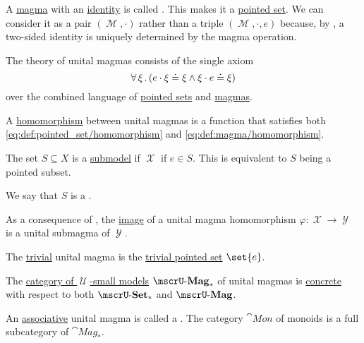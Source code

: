 \begin{definition}\label{def:unital_magma}
  A \hyperref[def:magma]{magma} with an \hyperref[def:magma_identity]{identity} is called . This makes it a \hyperref[def:pointed_set]{pointed set}. We can consider it as a pair \( (\mscrM, \cdot) \) rather than a triple \( (\mscrM, \cdot, e) \) because, by , a two-sided identity is uniquely determined by the magma operation.

  \begin{thmenum}
     The theory of unital magmas consists of the single axiom
    \begin{equation}\label{eq:def:unital_magma/theory/identity}
      \forall \thinspace \xi \thinspace . \thinspace (e \cdot \xi \doteq \xi \wedge \xi \cdot e \doteq \xi)
    \end{equation}
    over the combined language of \hyperref[def:pointed_set/theory]{pointed sets} and \hyperref[def:magma/theory]{magmas}.

     A \hyperref[def:first_order_homomorphism]{homomorphism} between unital magmas is a function that satisfies both \eqref{eq:def:pointed_set/homomorphism} and \eqref{eq:def:magma/homomorphism}.

     The set \( S \subseteq X \) is a \hyperref[thm:substructure_is_model]{submodel} if \( \mscrX \) if \( e \in S \). This is equivalent to \( S \) being a pointed subset.

    We say that \( S \) is a .

    As a consequence of , the \hyperref[def:multi_valued_function/image]{image} of a unital magma homomorphism \( \varphi: \mscrX \to \mscrY \) is a unital submagma of \( \mscrY \).

     The \hyperref[thm:substructures_form_complete_lattice/bottom]{trivial} unital magma is the \hyperref[def:pointed_set/trivial]{trivial pointed set} \( \set{ e } \).

     The \hyperref[def:category_of_small_first_order_models]{category of \( \mscrU \)-small models} \( \ucat{Mag}_* \) of unital magmas is \hyperref[def:concrete_category]{concrete} with respect to both \hyperref[def:pointed_set/category]{\( \ucat{Set}_* \)} and \hyperref[def:magma/category]{\( \ucat{Mag} \)}.

     An \hyperref[eq:def:magma/associative]{associative} unital magma is called a . The category \( \cat{Mon} \) of monoids is a full subcategory of \( \cat{Mag}_* \).


\end{thmenum}
\end{definition}

